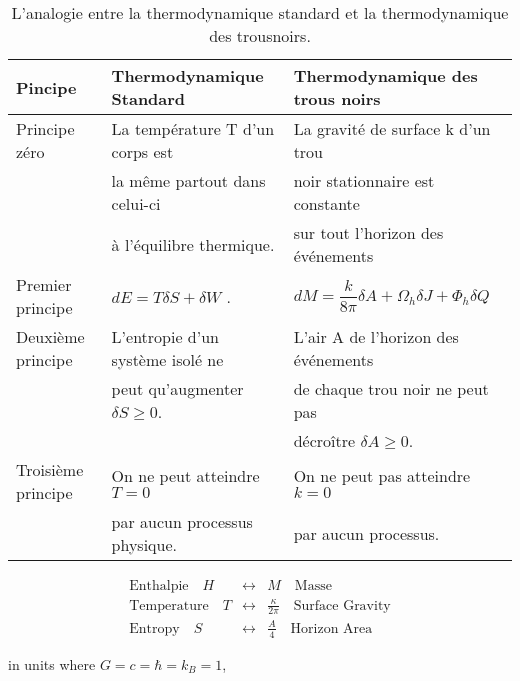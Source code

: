  
\begin{table}
	{ \renewcommand{\arraystretch}{1.4}
\begin{tabular}{|l|l|l|}
\hline
 Pincipe & Thermodynamique Standard  & Thermodynamique des trous noirs\\
 \hline
 Principe zéro & La température T d’un corps est &  La gravité de surface k d’un trou \\
            &             la même  partout  dans celui-ci &  noir stationnaire est constante  \\
             &              à l’équilibre thermique.  &  sur tout l’horizon des événements \\
\hline
Premier principe & $dE=T\delta S+ \delta W$ . & $dM=\dfrac{k}{8\pi}\delta A+\Omega_{h}\delta J+\Phi_{h}\delta Q$ \\
\hline
Deuxième principe & L'entropie d'un système isolé ne   & L'air A de l'horizon des événements \\
       &  peut qu'augmenter $\delta S \geq 0$.   &  de chaque trou noir ne peut pas  \\
         &     & décroître $\delta A\geq 0$.\\
\hline
Troisième principe & On ne peut atteindre $T = 0$ & On ne peut pas atteindre $k = 0$\\
               &      par aucun processus physique.   &  par aucun processus. \\
\hline
\end{tabular}}
\caption{L'analogie entre la thermodynamique standard et la thermodynamique des trousnoirs.}
\end{table}









\begin{eqnarray}
\textrm{Enthalpie}\quad  H &\leftrightarrow&  M\quad  \textrm{Masse}   \nonumber\\
\textrm{Temperature}\quad  T &\leftrightarrow&  \frac{\kappa}{2\pi} \quad  \textrm{Surface Gravity}   \nonumber\\
\textrm{Entropy}\quad  S &\leftrightarrow&  \frac{A}{4 } \quad  \textrm{Horizon Area}   \nonumber
\label{eq:01}
\end{eqnarray}

in units where $G=c=\hbar =k_B=1$,



